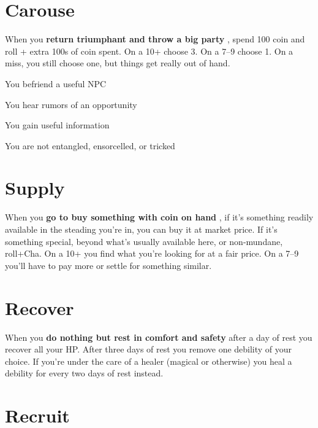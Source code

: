  
\section{Carouse}   
 

When you {\bf return triumphant and throw a big party} , spend 100 coin and roll + extra 100s of coin spent. On a 10+ choose 3. On a 7–9 choose 1. On a miss, you still choose one, but things get really out of hand.

 
\startitemize[1,packed]

\item You befriend a useful NPC

 
\item You hear rumors of an opportunity

 
\item You gain useful information

 
\item You are not entangled, ensorcelled, or tricked


\stopitemize
 
\section{Supply}   
 

When you {\bf go to buy something with coin on hand} , if it's something readily available in the steading you're in, you can buy it at market price. If it's something special, beyond what's usually available here, or non-mundane, roll+Cha. On a 10+ you find what you're looking for at a fair price. On a 7–9 you'll have to pay more or settle for something similar.

 
\section{Recover}   
 

When you {\bf do nothing but rest in comfort and safety}  after a day of rest you recover all your HP. After three days of rest you remove one debility of your choice. If you're under the care of a healer (magical or otherwise) you heal a debility for every two days of rest instead.

 
\section{Recruit}   
 

